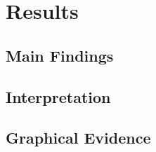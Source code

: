 \section{Results}

\subsection{Main Findings}
%   

\subsection{Interpretation}

\subsection{Graphical Evidence}
